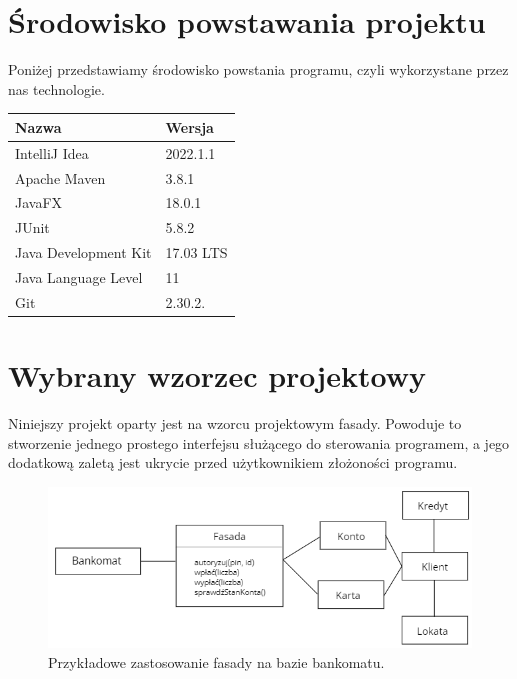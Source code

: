 \documentclass[10pt, a4paper]{report}
\begin{document}
\section{Środowisko powstawania projektu}\label{sec:środowisko-powstawania-projektu}
Poniżej przedstawiamy środowisko powstania programu, czyli wykorzystane przez
nas technologie.
\newline \begin{tabularx}{\textwidth}{ l|l }
  \hline Nazwa                & Wersja    \\
  \hline IntelliJ Idea        & 2022.1.1  \\
  \hline Apache Maven         & 3.8.1     \\
  \hline JavaFX               & 18.0.1    \\
  \hline JUnit                & 5.8.2     \\
  \hline Java Development Kit & 17.03 LTS \\
  \hline Java Language Level  & 11        \\
  \hline Git                  & 2.30.2.   \\
  \hline
\end{tabularx}

\section{Wybrany wzorzec projektowy}\label{sec:wybrany-wzorzec-projektowy}
Niniejszy projekt oparty jest na wzorcu projektowym fasady.
Powoduje to stworzenie jednego prostego interfejsu służącego do sterowania
programem,
a jego dodatkową zaletą jest ukrycie przed użytkownikiem złożoności programu.

\begin{figure}[h]
  \begin{center}
    \includegraphics[scale=0.45]{facede.png}
    \caption{Przykładowe zastosowanie fasady na bazie bankomatu.}
  \end{center}
\end{figure}
\newpage
\end{document}
